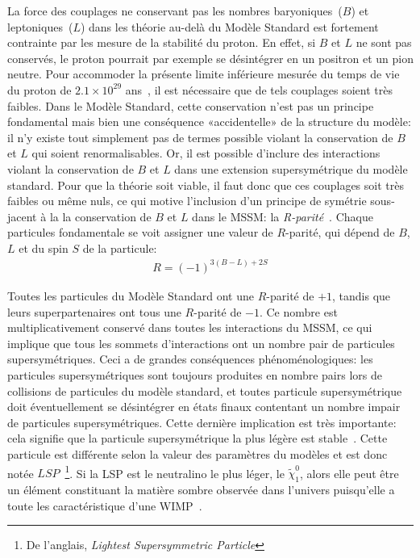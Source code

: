 La force des couplages ne conservant pas les nombres baryoniques~($B$)
et leptoniques~($L$) dans les théorie au-delà du Modèle Standard est
fortement contrainte par les mesure de la stabilité du proton. En
effet, si $B$ et $L$ ne sont pas conservés, le proton pourrait par
exemple se désintégrer en un positron et un pion neutre. Pour
accommoder la présente limite inférieure mesurée du temps de vie du
proton de $2.1 \times 10^{29}$
ans~\cite{kamland_collaboration_search_2006}, il est nécessaire que de
tels couplages soient très faibles.  Dans le Modèle Standard, cette
conservation n'est pas un principe fondamental mais bien une
conséquence «accidentelle» de la structure du modèle: il n'y existe
tout simplement pas de termes possible violant la conservation de $B$
et $L$ qui soient renormalisables. Or, il est possible d'inclure des
interactions violant la conservation de $B$ et $L$ dans une extension
supersymétrique du modèle standard. Pour que la théorie soit viable,
il faut donc que ces couplages soit très faibles ou même nuls, ce qui
motive l'inclusion d'un principe de symétrie sous-jacent à la la
conservation de $B$ et $L$ dans le MSSM: la
\emph{R-parité}~\cite{martin_supersymmetry_1997}. Chaque particules
fondamentale se voit assigner une valeur de $R$-parité, qui dépend de
$B$, $L$ et du spin $S$ de la particule:
\begin{eqnarray}
  R = (-1)^{3(B - L) + 2S}
\end{eqnarray}

Toutes les particules du Modèle Standard ont une $R$-parité de $+1$,
tandis que leurs superpartenaires ont tous une $R$-parité de $-1$. Ce
nombre est multiplicativement conservé dans toutes les interactions du
MSSM, ce qui implique que tous les sommets d'interactions ont un
nombre pair de particules supersymétriques. Ceci a de grandes
conséquences phénoménologiques: les particules supersymétriques sont
toujours produites en nombre pairs lors de collisions de particules du
modèle standard, et toutes particule supersymétrique doit éventuellement se
désintégrer en états finaux contentant un nombre impair de particules
supersymétriques. Cette dernière implication est très importante:
cela signifie que la particule supersymétrique la plus légère est
stable~\cite{martin_supersymmetry_1997}. Cette particule est
différente selon la valeur des paramètres du modèles et est donc notée
$LSP$~\footnote{De l'anglais, \emph{Lightest Supersymmetric
    Particle}}. Si la LSP est le neutralino le plus léger, le
$\tilde{\chi}_1^0$, alors elle peut être un élément constituant la matière
sombre observée dans l'univers puisqu'elle a toute les caractéristique
d'une WIMP~\cite{olive_review_2014}.

